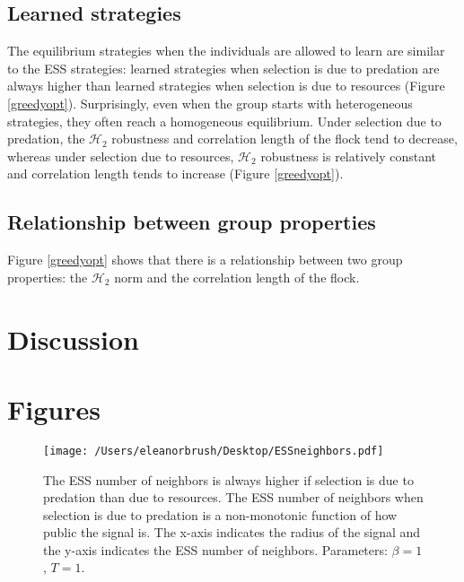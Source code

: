 \documentclass{article}
\begin{document}
\subsection{Learned strategies }
The equilibrium strategies when the individuals are allowed to learn are similar to the ESS strategies: learned strategies when selection is due to predation are always higher than learned strategies when selection is due to resources (Figure \ref{greedyopt}). Surprisingly, even when the group starts with heterogeneous strategies, they often reach a homogeneous equilibrium. Under selection due to predation, the $\mathscr{H}_2$ robustness and correlation length of the flock tend to decrease, whereas under selection due to resources, $\mathscr{H}_2$ robustness is relatively constant and correlation length tends to increase (Figure \ref{greedyopt}).

\subsection{Relationship between group properties }
Figure \ref{greedyopt} shows that there is a relationship between two group properties: the $\mathscr{H}_2$ norm and the correlation length of the flock.

\section{Discussion}

\section{Figures }
\begin{figure}[ht]
\texttt{[image: /Users/eleanorbrush/Desktop/ESSneighbors.pdf]}
\caption{\label{ESS} The ESS number of neighbors is always higher if selection is due to predation than due to resources.  The ESS number of neighbors when selection is due to predation is a non-monotonic function of how public the signal is. The x-axis indicates the radius of the signal and the y-axis indicates the ESS number of neighbors. Parameters:  $\beta=1$, $T=1$. 
}
\end{figure}
\end{document}

